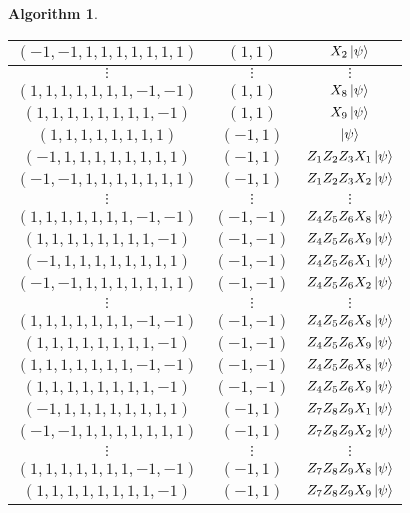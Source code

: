 \documentclass[12pt]{article}
\theoremstyle{plain}
\theoremstyle{definition}
\newtheorem{algorithm}[thm]{Algorithm}
\begin{document}
\begin{algorithm}
\begin{center}
\begin{tabular}{|c|c|c|}
			\hline
			$(-1,-1,1,1,1,1,1,1,1)$ & $(1,1)$ & $X_2\ket{\psi}$\\
			\hline
			$\vdots$ & $\vdots$ & $\vdots$\\
			\hline
			$(1,1,1,1,1,1,1,-1,-1)$ & $(1,1)$ & $X_8\ket{\psi}$\\
			\hline
			$(1,1,1,1,1,1,1,1,-1)$ & $(1,1)$ & $X_9\ket{\psi}$\\
			\hline
			$(1,1,1,1,1,1,1,1)$ & $(-1,1)$ & $\ket{\psi}$\\
			\hline
			$(-1,1,1,1,1,1,1,1,1)$ & $(-1,1)$ & $Z_1Z_2Z_3X_1\ket{\psi}$\\
			\hline
			$(-1,-1,1,1,1,1,1,1,1)$ & $(-1,1)$ & $Z_1Z_2Z_3X_2\ket{\psi}$\\
			\hline
			$\vdots$ & $\vdots$ & $\vdots$\\
			\hline
			$(1,1,1,1,1,1,1,-1,-1)$ & $(-1,-1)$ & $Z_4Z_5Z_6X_8\ket{\psi}$\\
			\hline
			$(1,1,1,1,1,1,1,1,-1)$ & $(-1,-1)$ & $Z_4Z_5Z_6X_9\ket{\psi}$\\
			\hline
			$(-1,1,1,1,1,1,1,1,1)$ & $(-1,-1)$ & $Z_4Z_5Z_6X_1\ket{\psi}$\\
			\hline
			$(-1,-1,1,1,1,1,1,1,1)$ & $(-1,-1)$ & $Z_4Z_5Z_6X_2\ket{\psi}$\\
			\hline
			$\vdots$ & $\vdots$ & $\vdots$\\
			\hline
			$(1,1,1,1,1,1,1,-1,-1)$ & $(-1,-1)$ & $Z_4Z_5Z_6X_8\ket{\psi}$\\
			\hline
			$(1,1,1,1,1,1,1,1,-1)$ & $(-1,-1)$ & $Z_4Z_5Z_6X_9\ket{\psi}$\\
			\hline
			$(1,1,1,1,1,1,1,-1,-1)$ & $(-1,-1)$ & $Z_4Z_5Z_6X_8\ket{\psi}$\\
			\hline
			$(1,1,1,1,1,1,1,1,-1)$ & $(-1,-1)$ & $Z_4Z_5Z_6X_9\ket{\psi}$\\
			\hline
			$(-1,1,1,1,1,1,1,1,1)$ & $(-1,1)$ & $Z_7Z_8Z_9X_1\ket{\psi}$\\
			\hline
			$(-1,-1,1,1,1,1,1,1,1)$ & $(-1,1)$ & $Z_7Z_8Z_9X_2\ket{\psi}$\\
			\hline
			$\vdots$ & $\vdots$ & $\vdots$\\
			\hline
			$(1,1,1,1,1,1,1,-1,-1)$ & $(-1,1)$ & $Z_7Z_8Z_9X_8\ket{\psi}$\\
			\hline
			$(1,1,1,1,1,1,1,1,-1)$ & $(-1,1)$ & $Z_7Z_8Z_9X_9\ket{\psi}$\\
			\hline
		\end{tabular}
	\end{center}
\end{algorithm}
\end{document}
